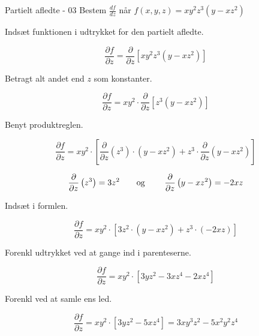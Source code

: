 \documentclass{article}
\begin{document}
\begin{exercise}{Partielt afledte - 03}
	Bestem $\frac{df}{dz}$ når $f(x,y,z) = xy^2z^3\left(y-xz^2\right)$ 
	
	
	\hint
	Indsæt funktionen i udtrykket for den partielt afledte.
	
	\hint
	
	\[
	\frac{\partial f}{\partial z} = \frac{\partial }{\partial z} \left[xy^2z^3\left(y-xz^2\right)\right]
	\]
	
	\hint
	Betragt alt andet end $z$ som konstanter.
	
	\hint
	\[
	\frac{\partial f}{\partial z} = xy^2 \cdot \frac{\partial }{\partial z} \left[ z^3\left(y-xz^2 \right) \right]
	\]
	
	\hint
	
	Benyt produktreglen.
	
	\hint
	\[
	\frac{\partial f}{\partial z} = xy^2 \cdot \left[\frac{\partial }{\partial z}\left(z^3 \right) \cdot \left( y-xz^2 \right) + z^3 \cdot \frac{\partial}{\partial z} \left(y-xz^2\right) \right]
	\]
	
	\hint
	\[\frac{\partial }{\partial z} \left(z^3\right) = 3z^2 \textrm{\qquad og \qquad} \frac{\partial }{\partial z} \left(y-xz^2\right) = -2xz
	\]
	
	\hint
	Indsæt i formlen.
	
	\hint
	\[
	\frac{\partial f}{\partial z} = xy^2 \cdot \left[3z^2 \cdot \left( y-xz^2 \right) + z^3 \cdot (-2xz) \right]
	\]
	
	\hint
	Forenkl udtrykket ved at gange ind i parenteserne.
	
	\hint
	\[
	\frac{\partial f}{\partial z} = xy^2 \cdot \left[3yz^2 - 3xz^4 -2xz^4 \right]
	\]
	
	\hint 
	Forenkl ved at samle ens led.
	
	\hint
	\[
	\frac{\partial f}{\partial z} = xy^2 \cdot \left[3yz^2 - 5xz^4\right] = 3xy^3z^2 - 5x^2y^2z^4
	\]
	
\end{exercise}

\newpage
\end{document}
